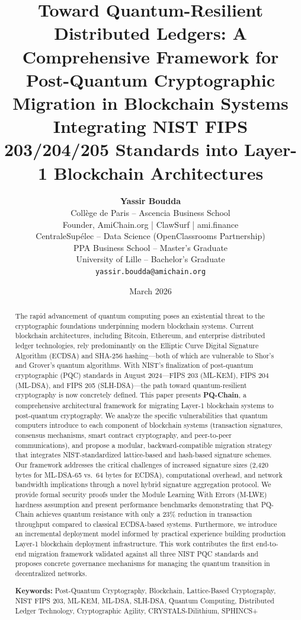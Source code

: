 \documentclass[12pt, a4paper, twocolumn]{article}
\title{%
  \vspace{-1cm}
  \LARGE\textbf{Toward Quantum-Resilient Distributed Ledgers: A Comprehensive Framework for Post-Quantum Cryptographic Migration in Blockchain Systems}\\[0.5em]
  \large Integrating NIST FIPS 203/204/205 Standards into Layer-1 Blockchain Architectures
}
\author{%
  \textbf{Yassir Boudda}\\[0.3em]
  \small Coll\`ege de Paris -- Ascencia Business School\\
  \small Founder, AmiChain.org | ClawSurf | ami.finance\\
  \small CentraleSup\'elec -- Data Science (OpenClassrooms Partnership)\\
  \small PPA Business School -- Master's Graduate\\
  \small University of Lille -- Bachelor's Graduate\\
  \small \texttt{yassir.boudda@amichain.org}
}
\date{March 2026}
\begin{document}
\maketitle

\begin{abstract}
\noindent
The rapid advancement of quantum computing poses an existential threat to the cryptographic foundations underpinning modern blockchain systems. Current blockchain architectures, including Bitcoin, Ethereum, and enterprise distributed ledger technologies, rely predominantly on the Elliptic Curve Digital Signature Algorithm (ECDSA) and SHA-256 hashing---both of which are vulnerable to Shor's and Grover's quantum algorithms. With NIST's finalization of post-quantum cryptographic (PQC) standards in August 2024---FIPS 203 (ML-KEM), FIPS 204 (ML-DSA), and FIPS 205 (SLH-DSA)---the path toward quantum-resilient cryptography is now concretely defined. This paper presents \textbf{PQ-Chain}, a comprehensive architectural framework for migrating Layer-1 blockchain systems to post-quantum cryptography. We analyze the specific vulnerabilities that quantum computers introduce to each component of blockchain systems (transaction signatures, consensus mechanisms, smart contract cryptography, and peer-to-peer communications), and propose a modular, backward-compatible migration strategy that integrates NIST-standardized lattice-based and hash-based signature schemes. Our framework addresses the critical challenges of increased signature sizes (2,420 bytes for ML-DSA-65 vs.\ 64 bytes for ECDSA), computational overhead, and network bandwidth implications through a novel hybrid signature aggregation protocol. We provide formal security proofs under the Module Learning With Errors (M-LWE) hardness assumption and present performance benchmarks demonstrating that PQ-Chain achieves quantum resistance with only a 23\% reduction in transaction throughput compared to classical ECDSA-based systems. Furthermore, we introduce an incremental deployment model informed by practical experience building production Layer-1 blockchain deployment infrastructure. This work contributes the first end-to-end migration framework validated against all three NIST PQC standards and proposes concrete governance mechanisms for managing the quantum transition in decentralized networks.

\medskip
\noindent\textbf{Keywords:} Post-Quantum Cryptography, Blockchain, Lattice-Based Cryptography, NIST FIPS 203, ML-KEM, ML-DSA, SLH-DSA, Quantum Computing, Distributed Ledger Technology, Cryptographic Agility, CRYSTALS-Dilithium, SPHINCS+
\end{abstract}
\end{document}
